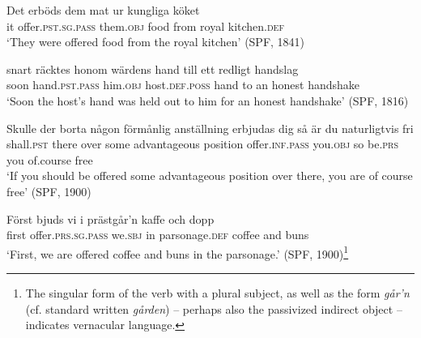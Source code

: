 \documentclass[output=paper]{langscibook}
\begin{document}
\ex\label{ex:falk:20c}
\gll Det  erböds          dem        mat    ur    kungliga    köket\\
      it      offer.\textsc{pst.sg.pass}    them.\textsc{obj}  food  from  royal      kitchen.\textsc{def}\\
\glt ‘They were offered food from the royal kitchen’ (SPF, 1841)

\ex\label{ex:falk:20d}
\gll snart  räcktes        honom    wärdens        hand  till   ett  redligt  handslag\\
      soon  hand\textsc{.pst.pass}  him\textsc{.obj}  host.\textsc{def.poss}   hand  to   an  honest   handshake\\
\glt ‘Soon the host’s hand was held out to him for an honest handshake’ (SPF, 1816)

\ex\label{ex:falk:20e}
\gll Skulle      der  borta  någon  förmånlig    anställning  erbjudas dig         så   är      du    naturligtvis    fri\\
shall.\textsc{pst}     there  over  some    advantageous  position     offer\textsc{.inf}.\textsc{pass}      you\textsc{.obj}   so  be.\textsc{prs}  you  of.course      free\\
\glt ‘If you should be offered some advantageous position over there, you are of         course free’ (SPF, 1900)

\ex\label{ex:falk:20f}
\gll Först  bjuds            vi      i  prästgår’n      kaffe    och  dopp\\
      first  offer\textsc{.prs}.\textsc{sg.pass}    we.\textsc{sbj}  in  parsonage\textsc{.def}  coffee  and  buns\\
\glt ‘First, we are offered coffee and buns in the parsonage.’ (SPF, 1900)\footnote{The singular form of the verb with a plural subject, as well as the form \textit{går’n} (cf. standard written \textit{gården}) – perhaps also the passivized indirect object – indicates vernacular language.}
\z
\z\largerpage
\end{document}
